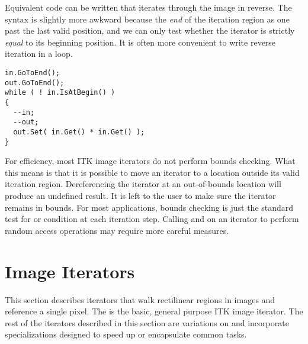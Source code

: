 Equivalent code can be written that iterates through the image in reverse.  The
syntax is slightly more awkward because the \emph{end} of the iteration region
as one past the last valid position, and we can only test whether the iterator
is strictly \emph{equal} to its beginning position.  It is often more
convenient to write reverse iteration in a  loop.

\begin{verbatim}
in.GoToEnd();
out.GoToEnd();
while ( ! in.IsAtBegin() )
{
  --in;
  --out;
  out.Set( in.Get() * in.Get() );
}

\end{verbatim}




For efficiency, most ITK image iterators do not perform bounds checking.  What
this means is that it is possible to move an iterator to a location outside its
valid iteration region.  Dereferencing the iterator at an out-of-bounds location
will produce an undefined result. It is left to the user to make sure the
iterator remains in bounds.  For most applications,  bounds checking is just
the standard test for  or  condition at each
iteration step.  Calling  and  on an iterator
to perform random access operations may require more careful measures.




\section{Image Iterators}
\label{sec:ImageIterators}
This section describes iterators that walk rectilinear regions in images and
reference a single pixel.  The  is the basic,
general purpose ITK image iterator.  The rest of the
iterators described in this section are variations on
 and incorporate specializations designed to 
speed up or encapsulate common tasks.

